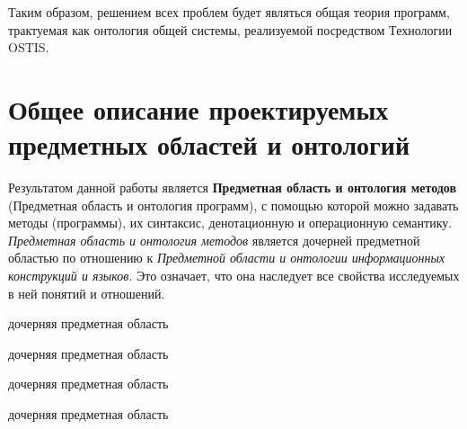 Таким образом, решением всех проблем будет являться общая теория программ, трактуемая как онтология общей системы, реализуемой посредством Технологии OSTIS.

\section{Общее описание проектируемых предметных областей и онтологий}

Результатом данной работы является \textbf{Предметная область и онтология методов} (Предметная область и онтология программ), с помощью которой можно задавать методы (программы), их синтаксис, денотационную и операционную семантику. \textit{Предметная область и онтология методов} является дочерней предметной областью по отношению к \textit{Предметной области и онтологии информационных конструкций и языков}. Это означает, что она наследует все свойства исследуемых в ней понятий и отношений.

\begin{SCn}
\begin{scnrelfromlist}{дочерняя предметная область}
    \begin{scnindent}
        \begin{scnrelfromlist}{дочерняя предметная область}
        \end{scnrelfromlist}
    \end{scnindent}
\end{scnrelfromlist}
\end{SCn}

\begin{SCn}
\begin{scnrelfromlist}{дочерняя предметная область}
    \begin{scnindent}
        \begin{scnrelfromlist}{дочерняя предметная область}
        \end{scnrelfromlist}
    \end{scnindent}
\end{scnrelfromlist}
\end{SCn}


